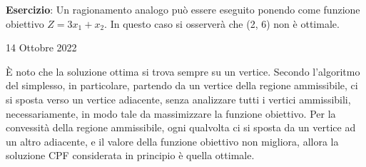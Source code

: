 \documentclass[a4paper]{extarticle}
\begin{document}
\vspace{1em}
\noindent
\textbf{Esercizio}: Un ragionamento analogo può essere eseguito ponendo come funzione obiettivo $Z = 3x_1 + x_2$. In questo caso si osserverà che (2, 6) non è ottimale.

\newpage
\begin{center}
    14 Ottobre 2022
\end{center}
È noto che la soluzione ottima si trova sempre su un vertice. Secondo l'algoritmo del simplesso, in particolare, partendo da un vertice della regione ammissibile, ci si sposta verso un vertice adiacente, senza analizzare tutti i vertici ammissibili, necessariamente, in modo tale da massimizzare la funzione obiettivo.
Per la convessità della regione ammissibile, ogni qualvolta ci si sposta da un vertice ad un altro adiacente, e il valore della funzione obiettivo non migliora, allora la soluzione CPF considerata in principio è quella ottimale.

\vspace{1em}
\end{document}
